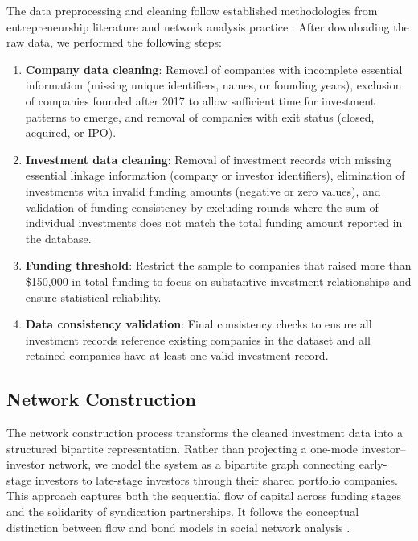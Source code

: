 The data preprocessing and cleaning follow established methodologies from entrepreneurship literature and network analysis practice \cite{Dalle2025}. After downloading the raw data, we performed the following steps:

\begin{enumerate}
    \item \textbf{Company data cleaning}: Removal of companies with incomplete essential information (missing unique identifiers, names, or founding years), exclusion of companies founded after 2017 to allow sufficient time for investment patterns to emerge, and removal of companies with exit status (closed, acquired, or IPO).
    
    \item \textbf{Investment data cleaning}: Removal of investment records with missing essential linkage information (company or investor identifiers), elimination of investments with invalid funding amounts (negative or zero values), and validation of funding consistency by excluding rounds where the sum of individual investments does not match the total funding amount reported in the database.
    
\item \textbf{Funding threshold}: Restrict the sample to companies that raised more than \$150{,}000 in total funding to focus on substantive investment relationships and ensure statistical reliability.
    
    
    \item \textbf{Data consistency validation}: Final consistency checks to ensure all investment records reference existing companies in the dataset and all retained companies have at least one valid investment record.
\end{enumerate}

\subsection{Network Construction}

The network construction process transforms the cleaned investment data into a structured bipartite representation. Rather than projecting a one-mode investor–investor network, we model the system as a bipartite graph connecting early-stage investors to late-stage investors through their shared portfolio companies. This approach captures both the sequential flow of capital across funding stages and the solidarity of syndication partnerships. It follows the conceptual distinction between flow and bond models in social network analysis \cite{Borgatti2009}. 

